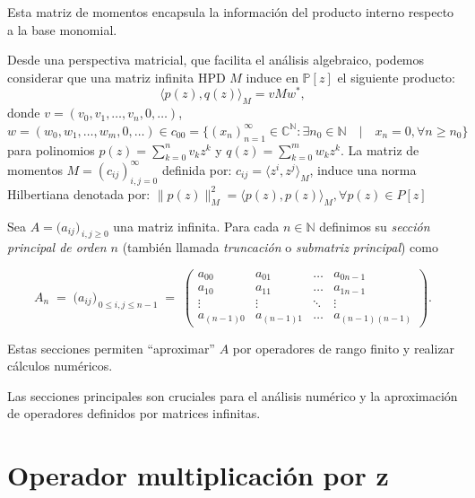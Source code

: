 Esta matriz de momentos encapsula la información del producto interno respecto a la base monomial.

Desde una perspectiva matricial, que facilita el análisis algebraico, podemos considerar que una matriz infinita HPD $M$ induce en $\mathbb{P}[z]$ el siguiente producto:
\begin{equation}
	\langle p(z), q(z) \rangle_M = v M w^{*},
\end{equation}
donde $v = (v_0, v_1, \ldots, v_n, 0, \ldots)$, $w = (w_0, w_1, \ldots, w_m, 0, \ldots) \in c_{00} = \{(x_n)_{n=1}^{\infty} \in \mathbb{C}^{\mathbb{N}} : \exists n_0 \in \mathbb{N} \quad | \quad x_n=0 ,\forall n\geq n_0\}$ para polinomios $p(z) = \sum_{k=0}^n v_k z^k$ y $q(z) = \sum_{k=0}^m w_k z^k$. La matriz de momentos $M = (c_{ij})^{\infty}_{i,j=0}$ definida por: $c_{ij} = \langle z^i, z^j \rangle_{M}$, induce una norma Hilbertiana denotada por: $\|p(z)\|^{2}_{M} = \langle p(z), p(z)\rangle_{M},\forall p(z) \in P[z]$

\begin{definition}\label{def:section_matrix}
	Sea \(A=\bigl(a_{ij}\bigr)_{\,i,j\ge 0}\) una matriz infinita.
	Para cada \(n\in\mathbb{N}\) definimos su \emph{sección principal de orden \(n\)} (también llamada
	\emph{truncación} o \emph{submatriz principal}) como

	\[
		A_n \;=\;
		\bigl(a_{ij}\bigr)_{\,0\le i,j\le n-1}\;=\;
		\begin{pmatrix}
			a_{00}     & a_{01}     & \dots  & a_{0n-1}       \\
			a_{10}     & a_{11}     & \dots  & a_{1n-1}       \\
			\vdots     & \vdots     & \ddots & \vdots         \\
			a_{(n-1)0} & a_{(n-1)1} & \dots  & a_{(n-1)(n-1)}
		\end{pmatrix}.
	\]

	Estas secciones permiten “aproximar” \(A\) por operadores de rango finito y realizar cálculos numéricos.
\end{definition}

Las secciones principales son cruciales para el análisis numérico y la aproximación de operadores definidos por matrices infinitas.

\section{Operador multiplicación por z}

